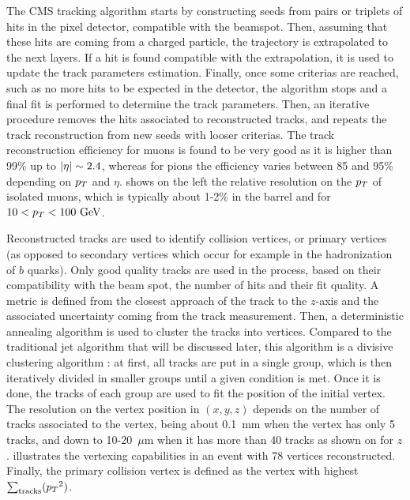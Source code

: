         The CMS tracking algorithm \cite{CMStracking} starts by constructing seeds from pairs or triplets of hits
        in the pixel detector, compatible with the beamspot. Then, assuming that these
        hits are coming from a charged particle, the trajectory is extrapolated to the
        next layers. If a hit is found compatible with the extrapolation, it is used to
        update the track parameters estimation. Finally, once some criterias are reached,
        such as no more hits to be expected in the detector, the algorithm stops and a
        final fit is performed to determine the track parameters. Then, an iterative procedure removes the
        hits associated to reconstructed tracks, and repeats the track reconstruction
        from new seeds with looser criterias.
        The track reconstruction efficiency for muons is found to be very good as it is
        higher than 99\% up to $\left| \eta \right| \sim 2.4$, whereas for pions the efficiency varies
        between 85 and 95\% depending on $p_T$ and $\eta$. 
        shows on the left the relative resolution on the $p_T$ of isolated muons, which
        is typically about 1-2\% in the barrel and for $10 < p_T < 100~\text{GeV}$.

        Reconstructed tracks are used to identify collision vertices, or primary vertices
        (as opposed to secondary vertices which occur for example in the hadronization of $b$ quarks).
        Only good quality tracks are used in the process, based on their
        compatibility with the beam spot, the number of hits and their fit quality. A
        metric is defined from the closest approach of the track to the $z$-axis and
        the associated uncertainty coming from the track measurement. Then, a deterministic
        annealing algorithm \cite{DAclustering} is used to cluster the tracks into vertices. Compared to the
        traditional jet algorithm that will be discussed later, this algorithm is a divisive
        clustering algorithm : at first, all tracks are put in a single group, which is then
        iteratively divided in smaller groups until a given condition is met. Once it is
        done, the tracks of each group are used to fit the position of the initial vertex.
        The resolution on the vertex position in $(x,y,z)$ depends on the number of tracks
        associated to the vertex, being about 0.1~mm when the vertex has only 5 tracks, and
        down to 10-20~$\mu$m when it has more than 40 tracks as shown on  for $z$.
         illustrates the vertexing capabilities in an event with
        78 vertices reconstructed. Finally, the primary collision vertex is defined as the
        vertex with highest $\sum_\text{tracks} ({p_T}^2)$.

